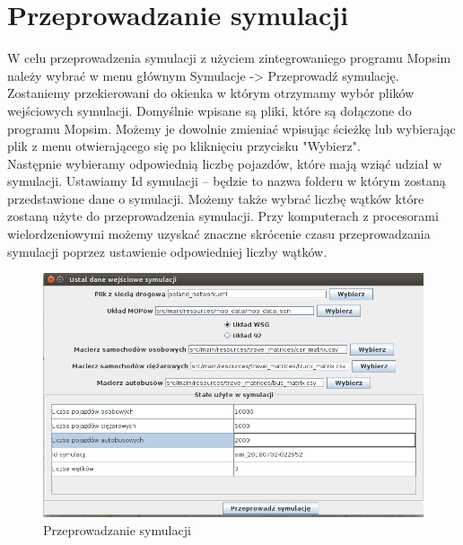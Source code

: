 \documentclass[10pt,paper=a4 BCOR0, DIV15, titlepage=false, oneside]{scrbook} %
\begin{document}
\section{Przeprowadzanie symulacji}
    W celu przeprowadzenia symulacji z użyciem zintegrowaniego programu Mopsim należy wybrać w menu głównym Symulacje -> Przeprowadź symulację. Zostaniemy przekierowani do okienka w którym otrzymamy wybór plików wejściowych symulacji. Domyślnie wpisane są pliki, które są dołączone do programu Mopsim. Możemy je dowolnie zmieniać wpisując ścieżkę lub wybierając plik z menu otwierającego się po kliknięciu przycisku "Wybierz". \\
    Następnie wybieramy odpowiednią liczbę pojazdów, które mają wziąć udział w symulacji. Ustawiamy Id symulacji -- będzie to nazwa folderu w którym zostaną przedstawione dane o symulacji. Możemy także wybrać liczbę wątków które zostaną użyte do przeprowadzenia symulacji. Przy komputerach z procesorami wielordzeniowymi możemy uzyskać znaczne skrócenie czasu przeprowadzania symulacji poprzez ustawienie odpowiedniej liczby wątków.
    \begin{figure}[ht]
        \centering
       \includegraphics[width=.8\textwidth]{symulacja.png}
        \caption{Przeprowadzanie symulacji}
      \end{figure}
\end{document}
